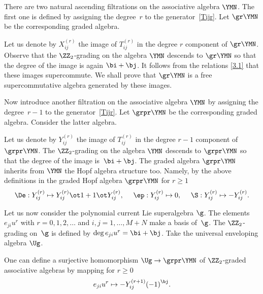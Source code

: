 There are two natural
ascending filtrations on
the associative algebra $\YMN $. The first one is defined by
assigning the degree~$r$ to the generator~\eqref{Tijr}.
Let $\gr\YMN$ be the corresponding graded algebra.

Let us denote by $X_{ij}^{(r)}$ the image of $T_{ij}^{(r)}$
in the degree $r$ component of $\gr\YMN $.
Observe that the $\ZZ_2 $-grading on the algebra $\YMN$ descends to
$\gr\YMN$ so that the degree of the image is again
$\bi + \bj $. It follows from the relations \eqref{3.1}
that these images supercommute.
We shall prove that
$\gr\YMN$ is a free supercommutative algebra generated by
these images.

Now introduce another filtration on the associative algebra $\YMN$
by assigning the deg\-ree~$r-1$ to the generator~\eqref{Tijr}.
Let $\grpr\YMN$ be the corresponding graded algebra.
Consider the latter algebra.

Let us denote by $Y_{ij}^{(r)}$ the image of $T_{ij}^{(r)}$
in the degree $r-1$ component of $\grpr\YMN $.
The $\ZZ_2 $-grading on the algebra
$\YMN$ descends to
$\grpr\YMN$ so that the degree of the image is~$\bi + \bj $.
The graded algebra $\grpr\YMN$ inherits from $\YMN$ the Hopf algebra structure too.
Namely, by the above definitions in
the graded Hopf algebra $\grpr\YMN$ for $r\ge1$ %
\begin{gather}
\label{grprH}
\De: Y_{ij}^{(r)}\mapsto Y_{ij}^{(r)}\ot1+1\ot Y_{ij}^{(r)} ,
\ \quad
\ep: Y_{ij}^{(r)}\mapsto0 ,
\ \quad
\S: Y_{ij}^{(r)}\mapsto- Y_{ij}^{(r)} .
\end{gather}

Let us now consider the polynomial current Lie superalgebra $\g $.
The elements $e_{ji} u^{r}$ with $r=0 ,1 ,2 , \dots$
and $i ,j=1 ,\dots, M+N$ make a basis of~$\g $.
The $\ZZ_{2}$-grading on~$\g$ is defined by
$\deg e_{ji} u^{r}=\bi+\bj $. Take
the universal enveloping algebra $\Ug $.

\begin{Proposition}
\label{P21}
One can define a surjective homomorphism $\Ug\to\grpr\YMN$
of $\ZZ_2$-graded associative algebras by mapping for $r\ge0$
\begin{gather}
\label{UY}
e_{ji} u^r\mapsto- Y_{ij}^{(r+1)} {(-1)}^{\bj} .
\end{gather}
\end{Proposition}


